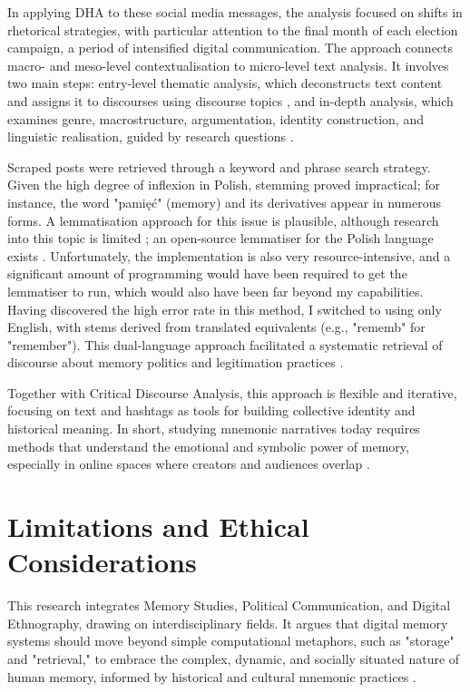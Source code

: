 In applying DHA to these social media messages, the analysis focused on shifts in rhetorical strategies, with particular attention to the final month of each election campaign, a period of intensified digital communication. The approach connects macro- and meso-level contextualisation to micro-level text analysis. It involves two main steps: entry-level thematic analysis, which deconstructs text content and assigns it to discourses using discourse topics \citep{van_dijk_principles_1993}, and in-depth analysis, which examines genre, macrostructure, argumentation, identity construction, and linguistic realisation, guided by research questions \citep{reisigl_discourse_2001}.

Scraped posts were retrieved through a keyword and phrase search strategy. Given the high degree of inflexion in Polish, stemming proved impractical; for instance, the word "pamięć" (memory) and its derivatives appear in numerous forms. A lemmatisation approach for this issue is plausible, although research into this topic is limited \citep{krasnowska2019empirical}; an open-source lemmatiser for the Polish language exists \citep{gawinecki_lemmatizer-pl}. Unfortunately, the implementation is also very resource-intensive, and a significant amount of programming would have been required to get the lemmatiser to run, which would also have been far beyond my capabilities. Having discovered the high error rate in this method, I switched to using only English, with stems derived from translated equivalents (e.g., "rememb" for "remember"). This dual-language approach facilitated a systematic retrieval of discourse about memory politics and legitimation practices \citep{karwatowski_context_2022}.

Together with Critical Discourse Analysis, this approach is flexible and iterative, focusing on text and hashtags as tools for building collective identity and historical meaning. In short, studying mnemonic narratives today requires methods that understand the emotional and symbolic power of memory, especially in online spaces where creators and audiences overlap \citep{matthes_digital_2017}.

\section{Limitations and Ethical Considerations}

This research integrates Memory Studies, Political Communication, and Digital Ethnography, drawing on interdisciplinary fields. It argues that digital memory systems should move beyond simple computational metaphors, such as "storage" and "retrieval," to embrace the complex, dynamic, and socially situated nature of human memory, informed by historical and cultural mnemonic practices \citep{van_house_technologies_2008}.

